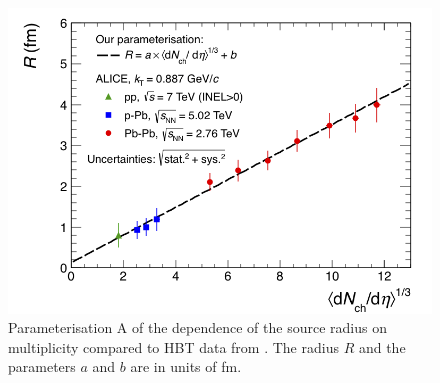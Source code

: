 \documentclass[%
 reprint,
 amsmath,amssymb,
 aps,
]{revtex4-1}
\begin{document}
\begin{figure}[htbp]
\begin{center}
\includegraphics[width=\columnwidth]{HbtRadiusParam.png}
\caption{Parameterisation A of the dependence of the source radius on multiplicity compared to HBT data from \cite{Adam:2015vna, Adam:2015pya, Abelev:2012sq}. The radius $R$ and the parameters $a$ and $b$ are in units of fm.}
\label{fig:radiiparam}
\end{center}
\end{figure}
\end{document}
